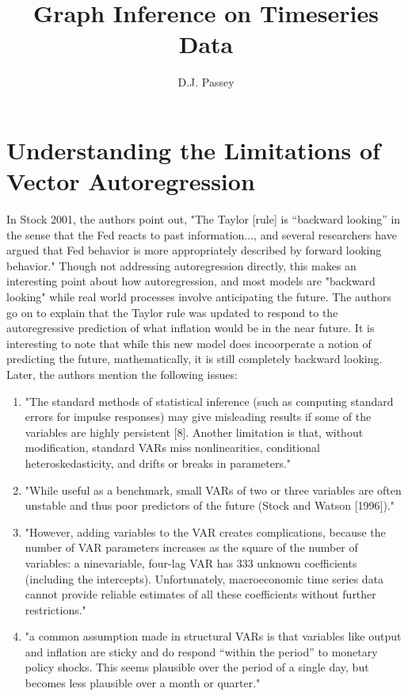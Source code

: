 \documentclass{article}
\title{Graph Inference on Timeseries Data}
\author{D.J. Passey}
\begin{document}
\maketitle

\section{Understanding the Limitations of Vector Autoregression}

    In Stock 2001, the authors point out, "The Taylor [rule] is “backward 
    looking” in the sense that the Fed reacts to past information..., 
    and several researchers have argued that Fed behavior is more
    appropriately described by forward looking behavior."
    Though not addressing autoregression directly, this makes an
    interesting point about how autoregression, and most models are
    "backward looking" while real world processes involve
    anticipating the future.
    The authors go on to explain that the Taylor rule was updated
    to respond to the autoregressive prediction of what inflation
    would be in the near future. It is interesting to note that
    while this new model does incoorperate a notion of predicting
    the future, mathematically, it is still completely backward looking.
    Later, the authors mention the following issues: 
    \begin{enumerate}
        \item "The
        standard methods of statistical inference (such as computing 
        standard errors for impulse responses) may give misleading 
        results if some of the variables are highly persistent [8].
        Another limitation is that, without modification, standard 
        VARs miss nonlinearities, conditional heteroskedasticity, and
        drifts or breaks in parameters."
        \item "While useful as a benchmark, small
        VARs of two or three variables are often unstable and thus poor predictors of the future
        (Stock and Watson [1996])."
        \item "However, adding variables to the VAR creates complications, because the
        number of VAR parameters increases as the square of the number of variables: a ninevariable, four-lag VAR has 333 unknown coefficients (including the intercepts).
        Unfortunately, macroeconomic time series data cannot provide reliable estimates of all
        these coefficients without further restrictions."
        \item "a common assumption made in
        structural VARs is that variables like output and inflation
        are sticky and do respond “within the period” to monetary 
        policy shocks. This seems plausible over the period of a 
        single day, but becomes less plausible over a month or
        quarter."
    \end{enumerate}
\end{document}
